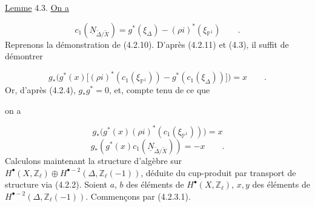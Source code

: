 \underline{Lemme} 4.3. \underline{On a}

\begin{equation*}
c_1(\underline{N}_{\widetilde{\Delta}/\widetilde{X}}) = g^*(\xi_\Delta) - (\rho i)^*(\xi_{\mathbb{P}^1}) \qquad .
\end{equation*}
Reprenons la démonstration de (4.2.10). D'après (4.2.11) et (4.3), il suffit de démontrer

\begin{equation*}
g_*\bigl(g^*(x)\bigl[(\rho i)^* (c_1(\xi_{\mathbb{P}^1})) - g^*(c_1(\xi_\Delta))\bigr]\bigr) = x \qquad .
\end{equation*}
Or, d'après (4.2.4), $g_*g^* = 0$, et, compte tenu de ce que

\begin{center}
\end{center}
on a

\begin{equation}\tag{4.3.1}
g_*\bigl(g^*(x) (\rho i)^*(c_1(\xi_{\mathbb{P}^1}))\bigr) = x
\end{equation}
\begin{equation}\tag{4.3.2}
g_*(g^*(x) c_1(\underline{N}_{\widetilde{\Delta}/\widetilde{X}})) = - x \qquad .
\end{equation}
Calculons maintenant la structure d'algèbre sur $H^{\bullet}(X,\mathbb{Z}_{\ell}) \oplus H^{\bullet-2}(\Delta, \mathbb{Z}_{\ell}(-1))$, déduite du cup-produit par transport de structure via (4.2.2). Soient $a$, $b$ des éléments de $H^{\bullet}(X,\mathbb{Z}_{\ell})$, $x,y$ des éléments de $H^{\bullet-2}(\Delta,\mathbb{Z}_{\ell}(-1))$. Commençons par (4.2.3.1).

